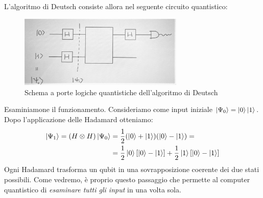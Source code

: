 \documentclass[../../InformazioneQuantistica.tex]{subfiles}
\begin{document}
L'algoritmo di Deutsch consiste allora nel seguente circuito quantistico:
\begin{figure}[H]
\centering
\includegraphics[width=0.7\textwidth]{Immagini/17_4/3.jpg}
\caption{Schema a porte logiche quantistiche dell'algoritmo di Deutsch\label{fig:Deutsch-gates}}
\end{figure}

Esaminiamone il funzionamento. Consideriamo come input iniziale $\Ket{\Psi_0} = \Ket{0}\Ket{1}$.\\
Dopo l'applicazione delle Hadamard otteniamo:
\begin{align*}
\Ket{\Psi_1} = (H\otimes H) \Ket{\Psi_0} &= \frac{1}{2}(\Ket{0}+\Ket{1})(\Ket{0}-\Ket{1}) =\\
&= \frac{1}{2}\Ket{0}[\Ket{0}-\Ket{1}] + \frac{1}{2}\Ket{1}[\Ket{0}-\Ket{1}]
\end{align*}
Ogni Hadamard trasforma un qubit in una sovrapposizione coerente dei due stati possibili. Come vedremo, è proprio questo passaggio che permette al computer quantistico di \textit{esaminare tutti gli input} in una volta sola.\\
\end{document}
